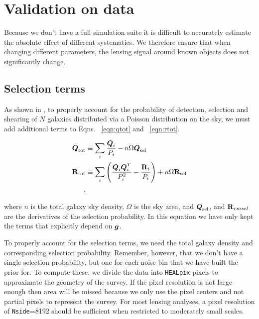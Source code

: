 \documentclass[useAMS,usenatbib]{mnras}
\newcommand{\vecg}{\mbox{\boldmath $g$}}
\newcommand{\vecQ}{\mbox{\boldmath $Q$}}
\newcommand{\matR}{\mbox{$\bf R$}}
\begin{document}
\section{Validation on data}
\label{Sec:Data}

Because we don't have a full simulation suite it is difficult to accurately estimate the absolute effect of different systematics.  We therefore ensure that when changing different parameters, the lensing signal around known objects does not significantly change.

\subsection{Selection terms}
As shown in \cite{Bernstein2016}, to properly account for the probability of detection, selection and shearing of $N$ galaxies distributed via a Poisson distribution on the sky, we must add additional terms to Eqns. ~\ref{eqn:qtot} and ~\ref{eqn:rtot}. 

\begin{align}
\label{eqn:qtot_sel}
\vecQ_{\rm tot} & \equiv \sum_i   \frac{\vecQ_i}{P_i} - n\Omega \vecQ_{\rm sel}\\
\label{eqn:rtot_sel}
\matR_{\rm tot} & \equiv \sum_i \left(
   \frac{\vecQ_i\vecQ_i^T}{P_i^2} - \frac{\matR_i}{P_i}\right) + n\Omega \matR_{\rm sel}\\,
\end{align}

where $n$ is the total galaxy sky density, $\Omega$ is the sky area, and $\vecQ_{\rm sel}$, and $\matR_{rm sel}$ are the derivatives of the selection probability.  In this equation we have only kept the terms that explicitly depend on $\vecg$.

To properly account for the selection terms, we need the total galaxy density and corresponding selection probability.  Remember, however, that we don't have a single selection probability, but one for each noise bin that we have built the prior for.  To compute these, we divide the data into \texttt{HEALpix} pixels to approximate the geometry of the survey.   If the pixel resolution is not large enough then area will be missed because we only use the pixel centers and not partial pixels to represent the survey.  For most lensing analyses, a pixel resolution of \texttt{Nside}=8192 should be sufficient when restricted to moderately small scales.
\end{document}
